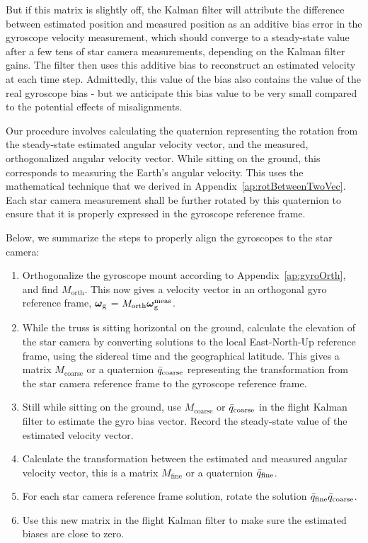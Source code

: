 But if this matrix is slightly off, the Kalman filter will attribute the difference between estimated position and measured position as an additive bias error in the gyroscope velocity measurement, which should converge to a steady-state value after a few tens of star camera measurements, depending on the Kalman filter gains. The filter then uses this additive bias to reconstruct an estimated velocity at each time step. Admittedly, this value of the bias also contains the value of the real gyroscope bias - but we anticipate  this bias value to be very small compared to the potential effects of misalignments.

Our procedure involves calculating the quaternion representing the rotation from the steady-state estimated angular velocity vector, and the measured, orthogonalized angular velocity vector. While sitting on the ground, this corresponds to measuring the Earth's angular velocity. This uses the mathematical technique that we derived in Appendix~\ref{ap:rotBetweenTwoVec}. Each star camera measurement shall be further rotated by this quaternion to ensure that it is properly expressed in the gyroscope reference frame. 

Below, we summarize the steps to properly align the gyroscopes to the star camera:
\begin{enumerate}
 \item Orthogonalize the gyroscope mount according to Appendix~\ref{ap:gyroOrth}, and find $M_\textrm{orth}$. This now gives a velocity vector in an orthogonal gyro reference frame, $\boldsymbol\omega_{\textrm{g}}$ = $M_\textrm{orth}\boldsymbol\omega_{\textrm{g}}^\textrm{meas}$. 
 \item While the truss is sitting horizontal on the ground, calculate the elevation of the star camera by converting solutions to the local East-North-Up reference frame, using the sidereal time and the geographical latitude. This gives a matrix $M_\textrm{coarse}$  or a quaternion $\bar{q}_\textrm{coarse}$ representing the transformation from the star camera reference frame to the gyroscope reference frame.
\item Still while sitting on the ground, use $M_\textrm{coarse}$ or $\bar{q}_\textrm{coarse}$ in the flight Kalman filter to estimate the gyro bias vector. Record the steady-state value of the estimated velocity vector.
 \item Calculate the transformation between the estimated and measured angular velocity vector, this is a matrix $M_\textrm{fine}$ or a quaternion $\bar{q}_\textrm{fine}$.
 \item For each star camera reference frame solution, rotate the solution $\bar{q}_\textrm{fine}\bar{q}_\textrm{coarse}$.
 \item Use this new matrix in the flight Kalman filter to make sure the estimated biases are close to zero. 
 \end{enumerate} 
